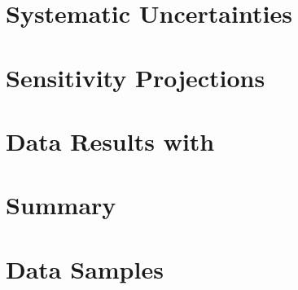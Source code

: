 \documentclass{cmspaper}
\begin{document}
\section{Systematic Uncertainties}

\section{Sensitivity Projections}
  

\section{Data Results with \intlumi}

\section{Summary}



\newpage 
\appendix
\appendixpage
\section{Data Samples}
  \label{app:datasets}
  
  
\end{document}
